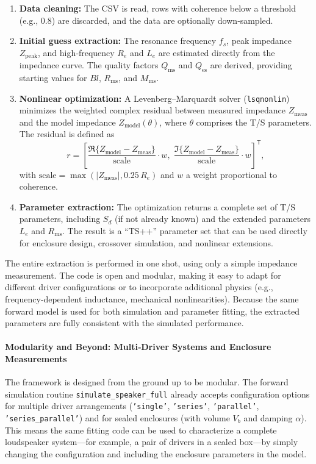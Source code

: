 \begin{enumerate}
  \item \textbf{Data cleaning:} The CSV is read, rows with coherence below a threshold (e.g., $0.8$) are discarded, and the data are optionally down‑sampled.
  \item \textbf{Initial guess extraction:} The resonance frequency $f_s$, peak impedance $Z_{\text{peak}}$, and high‑frequency $R_e$ and $L_e$ are estimated directly from the impedance curve. The quality factors $Q_{\text{ms}}$ and $Q_{\text{es}}$ are derived, providing starting values for $Bl$, $R_{\text{ms}}$, and $M_{\text{ms}}$.
  \item \textbf{Nonlinear optimization:} A Levenberg–Marquardt solver (\texttt{lsqnonlin}) minimizes the weighted complex residual between measured impedance $Z_{\text{meas}}$ and the model impedance $Z_{\text{model}}(\theta)$, where $\theta$ comprises the T/S parameters. The residual is defined as
        \[
        r = \left[ \frac{\Re\{Z_{\text{model}} - Z_{\text{meas}}\}}{\text{scale}} \cdot w, \; \frac{\Im\{Z_{\text{model}} - Z_{\text{meas}}\}}{\text{scale}} \cdot w \right]^{\mathsf{T}},
        \]
        with $\text{scale} = \max(|Z_{\text{meas}}|, 0.25\,R_e)$ and $w$ a weight proportional to coherence.
  \item \textbf{Parameter extraction:} The optimization returns a complete set of T/S parameters, including $S_d$ (if not already known) and the extended parameters $L_e$ and $R_{\text{ms}}$. The result is a “TS++” parameter set that can be used directly for enclosure design, crossover simulation, and nonlinear extensions.
\end{enumerate}

The entire extraction is performed in one shot, using only a simple impedance measurement. The code is open and modular, making it easy to adapt for different driver configurations or to incorporate additional physics (e.g., frequency‑dependent inductance, mechanical nonlinearities). Because the same forward model is used for both simulation and parameter fitting, the extracted parameters are fully consistent with the simulated performance.

\paragraph{Modularity and Beyond: Multi‑Driver Systems and Enclosure Measurements}

The framework is designed from the ground up to be modular. The forward simulation routine \texttt{simulate\_speaker\_full} already accepts configuration options for multiple driver arrangements (\texttt{'single'}, \texttt{'series'}, \texttt{'parallel'}, \texttt{'series\_parallel'}) and for sealed enclosures (with volume $V_b$ and damping $\alpha$). This means the same fitting code can be used to characterize a complete loudspeaker system—for example, a pair of drivers in a sealed box—by simply changing the configuration and including the enclosure parameters in the model.

